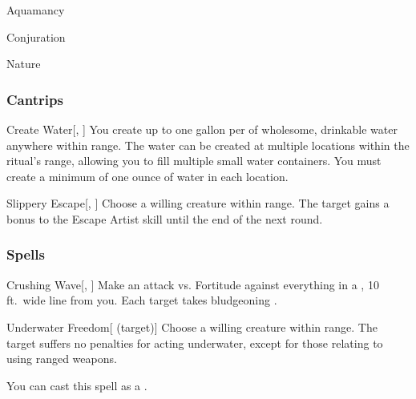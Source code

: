 \newpage
\begin{spellsection}{Aquamancy}

\begin{spellheader}
\end{spellheader}


 Conjuration

 Nature

\subsubsection{Cantrips}


\begin{apability}{Create Water}[, ]
You create up to one gallon per  of wholesome, drinkable water anywhere within \rngclose range.
The water can be created at multiple locations within the ritual's range, allowing you to fill multiple small water containers.
You must create a minimum of one ounce of water in each location.
\end{apability}


\begin{apability}{Slippery Escape}[, ]
Choose a willing creature within \rngclose range.
The target gains a  bonus to the Escape Artist skill until the end of the next round.
\end{apability}

\end{spellsection}


\subsubsection{Spells}


\lowercase{\hypertarget{spell:Crushing Wave}{}}\label{spell:Crushing Wave}
\begin{freeability}[\nth{1}]{\hypertarget{spell:Crushing Wave}{Crushing Wave}}[, ]
Make an attack vs. Fortitude against everything in a \areamed, 10 ft.\ wide line from you.
\hit Each target takes bludgeoning .
\end{freeability}
\vspace{0.25em}



\lowercase{\hypertarget{spell:Underwater Freedom}{}}\label{spell:Underwater Freedom}
\begin{attuneability}[\nth{1}]{\hypertarget{spell:Underwater Freedom}{Underwater Freedom}}[ (target)]
Choose a willing creature within \rngclose range.
The target suffers no penalties for acting underwater, except for those relating to using ranged weapons.

You can cast this spell as a .
\end{attuneability}
\vspace{0.25em}



